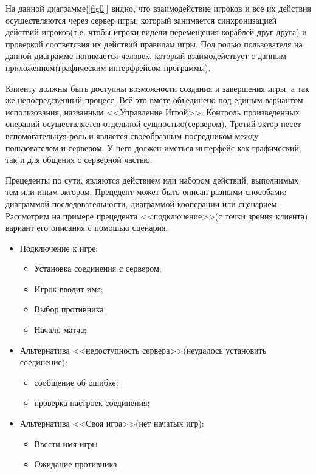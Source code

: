 На данной диаграмме[\ref{fig0}] видно, что взаимодействие игроков и все их действия осуществляются через сервер игры, который
занимается синхронизацией действий игроков(т.е. чтобы игроки видели перемещения кораблей друг друга)
и проверкой соответсвия их действий правилам игры. Под ролью пользователя на данной диаграмме понимается 
человек, который взаимодействует с данным приложением(графическим интерфрейсом программы).

Клиенту должны быть доступны возможности создания и завершения игры, а так же непосредсвенный процесс. Всё это вмете объединено под единым вариантом использования, названным <<Управление Игрой>>. Контроль произведенных операций осуществляется отдельной сущностью(сервером). Третий эктор несет вспомогательнуя роль и является своеобразным посредником между пользователем и сервером. У него должен иметься интерфейс как графический, так и для общения с серверной частью. 

Прецеденты по сути, являются действием или набором действий, выполнимых тем или иным эктором. Прецедент может быть описан разными способами: диаграммой последовательности, диаграммой кооперации или сценарием.
Рассмотрим на примере прецедента <<подключение>>(с точки зрения клиента) вариант его описания с помошью сценария.

\begin{itemize}
	\item Подключение к игре:
	\begin{itemize}
		\item Установка соединения с сервером;
		\item Игрок вводит имя;
		\item Выбор противника;
		\item Начало матча;
  	\end{itemize} 
	\item Альтернатива <<недоступность сервера>>(неудалось установить соединение): 
	\begin{itemize}
		\item сообщение об ошибке;
		\item проверка настроек соединения;
  	\end{itemize} 
	\item Альтернатива <<Своя игра>>(нет начатых игр):
	\begin{itemize}
		\item Ввести имя игры
		\item Ожидание противника
  	\end{itemize} 
\end{itemize} 

